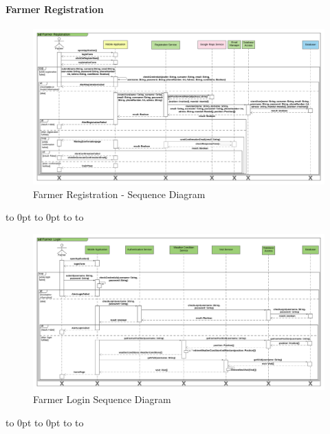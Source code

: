 \paragraph{Farmer Registration}


\def\fillandplacepagenumber{%
 \par\pagestyle{empty}%
\vbox to 0pt{\vss}\vfill
\vbox to 0pt{\baselineskip0pt
   \hbox to\linewidth{\hss}%
   \setlength{\footskip}{70pt}
   \baselineskip\footskip
   \hbox to\linewidth{%
     \hfil\thepage\hfil}\vss}}

\newpage
\begin{landscape}
\begin{figure}[h]
\vspace*{-2cm}
\noindent
\centering
\centerline{\includegraphics[scale= 0.108]{./Images/Farmer Registration Sequence Diagram.png}}
    \caption{Farmer Registration - Sequence Diagram}
    \vspace*{-12cm}
\end{figure}
\fillandplacepagenumber
\end{landscape}

\newpage
\begin{landscape}
\begin{figure}[h]
\vspace*{-2cm}
\noindent
\centering
\centerline{\includegraphics[scale= 0.108]{./Images/Farmer Login Sequence Diagram.png}}
    \caption{Farmer Login Sequence Diagram}
    \vspace*{-12cm}
\end{figure}
\fillandplacepagenumber
\end{landscape}

